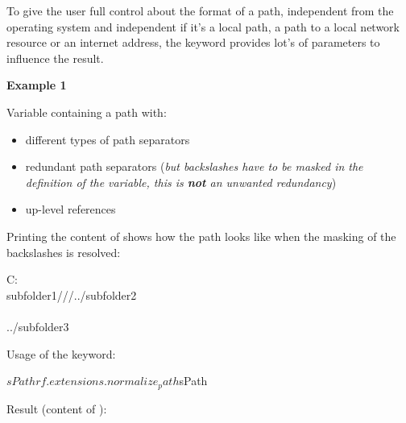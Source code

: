 To give the user full control about the format of a path, independent from the operating system and independent if it's
a local path, a path to a local network resource or an internet address, the keyword  provides
lot's of parameters to influence the result.

\vspace{1ex}

\textbf{Example 1}

\vspace{1ex}

Variable containing a path with:

\begin{itemize}
   \item different types of path separators
   \item redundant path separators (\textit{but backslashes have to be masked in the definition of the variable, this is \textbf{not} an unwanted redundancy})
   \item up-level references
\end{itemize}


Printing the content of  shows how the path looks like when the masking of the backslashes is resolved:

\begin{robotlog}
C:\\subfolder1///../subfolder2\\\\../subfolder3\\
\end{robotlog}

Usage of the  keyword:

\begin{robotcode}
${sPath}    rf.extensions.normalize_path    ${sPath}
\end{robotcode}

Result (content of ):

